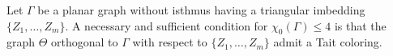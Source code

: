 Let $\Gamma$ be a planar graph without isthmus having a triangular imbedding $\{Z_1, \ldots, Z_m\}$. A necessary and sufficient condition for $\chi_0(\Gamma) \leq 4$ is that the graph $\Theta$ orthogonal to $\Gamma$ with respect to $\{Z_1, \ldots, Z_m\}$ admit a Tait coloring.
